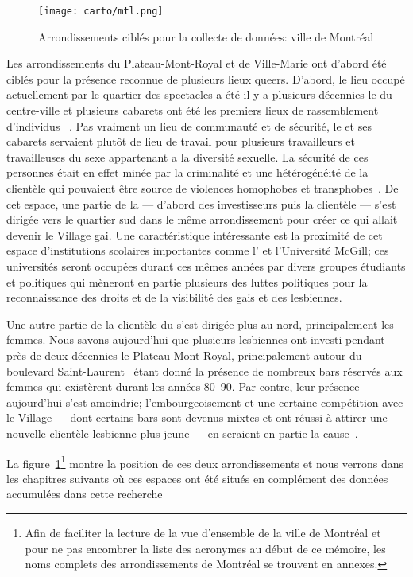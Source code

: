 \begin{figure}[ht]
 \centering
 \texttt{[image: carto/mtl.png]}
 \caption{Arrondissements ciblés pour la collecte de données: ville de
 Montréal}\label{fig:espaces_montreal}
\end{figure}

Les arrondissements du Plateau-Mont-Royal et de Ville-Marie ont d'abord été ciblés pour la présence reconnue de plusieurs lieux queers.
D'abord, le lieu occupé actuellement par le quartier des spectacles a été il y a plusieurs décennies le  du centre-ville et plusieurs cabarets ont été les premiers lieux de rassemblement d'individus \lgbt{}~\citep[198]{Podmore2015}.
Pas vraiment un lieu de communauté et de sécurité, le  et ses cabarets servaient plutôt de lieu de travail pour plusieurs travailleurs et travailleuses du sexe appartenant a la diversité sexuelle.
La sécurité de ces personnes était en effet minée par la criminalité et une hétérogénéité de la clientèle qui pouvaient être source de violences homophobes et transphobes~\parencite[91]{Higgins1999}.
De cet espace, une partie de la  --- d'abord des investisseurs puis la clientèle --- s'est dirigée vers le quartier sud dans le même arrondissement pour créer ce qui allait devenir le Village gai.
Une caractéristique intéressante est la proximité de cet espace d'institutions scolaires importantes comme l'\uqam{} et l'Université McGill; ces universités seront occupées durant ces mêmes années par divers groupes étudiants et politiques qui mèneront en partie plusieurs des luttes politiques pour la reconnaissance des droits et de la visibilité des gais et des lesbiennes.

Une autre partie de la clientèle \lgbt{} du  s'est dirigée plus au nord, principalement les femmes.
Nous savons aujourd'hui que plusieurs lesbiennes ont investi pendant près de deux décennies le Plateau Mont-Royal, principalement autour du boulevard Saint-Laurent~\citep[599]{Podmore2006} étant donné la présence de nombreux bars réservés aux femmes qui existèrent durant les années 80--90.
Par contre, leur présence aujourd'hui s'est amoindrie; l'embourgeoisement et une certaine compétition avec le Village --- dont certains bars sont devenus mixtes et ont réussi à attirer une nouvelle clientèle lesbienne plus jeune --- en seraient en partie la cause~\citep{Podmore2015}.

La figure~\ref{fig:espaces_montreal}\footnote{Afin de faciliter la lecture de la vue d'ensemble de la ville de Montréal et pour ne pas encombrer la liste des acronymes au début de ce mémoire, les noms complets des arrondissements de Montréal se trouvent en annexes.} montre la position de ces deux arrondissements et nous verrons dans les chapitres suivants où ces espaces ont été situés en complément des données accumulées dans cette recherche 


